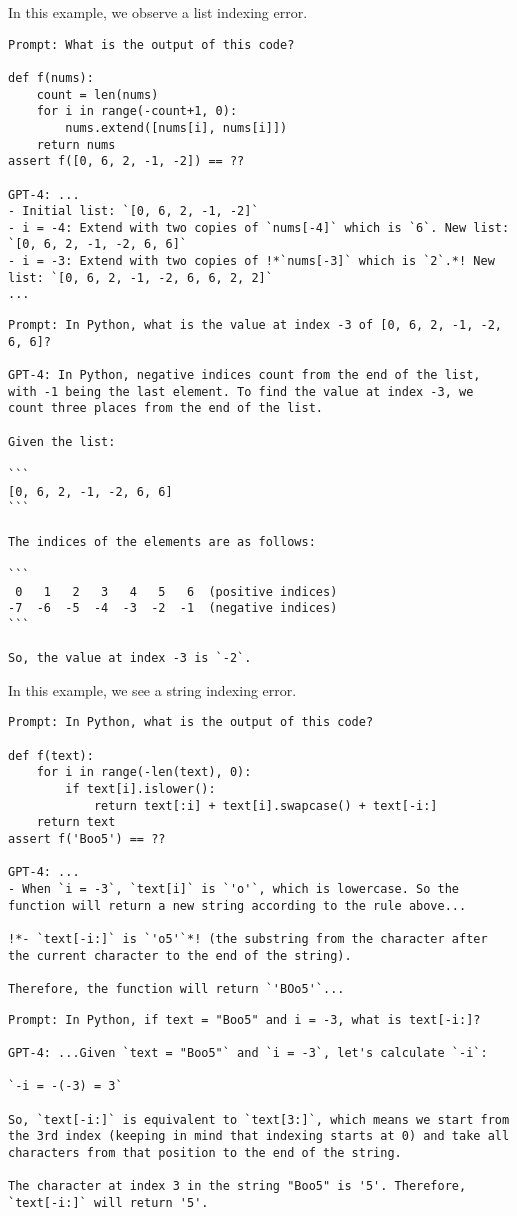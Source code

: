 In this example, we observe a list indexing error.
\begin{lstlisting}
Prompt: What is the output of this code?

def f(nums):
    count = len(nums)
    for i in range(-count+1, 0):
        nums.extend([nums[i], nums[i]])
    return nums
assert f([0, 6, 2, -1, -2]) == ??

GPT-4: ...
- Initial list: `[0, 6, 2, -1, -2]`
- i = -4: Extend with two copies of `nums[-4]` which is `6`. New list: `[0, 6, 2, -1, -2, 6, 6]`
- i = -3: Extend with two copies of !*`nums[-3]` which is `2`.*! New list: `[0, 6, 2, -1, -2, 6, 6, 2, 2]`
...
\end{lstlisting}

\begin{lstlisting}
Prompt: In Python, what is the value at index -3 of [0, 6, 2, -1, -2, 6, 6]?

GPT-4: In Python, negative indices count from the end of the list, with -1 being the last element. To find the value at index -3, we count three places from the end of the list.

Given the list:

```
[0, 6, 2, -1, -2, 6, 6]
```

The indices of the elements are as follows:

```
 0   1   2   3   4   5   6  (positive indices)
-7  -6  -5  -4  -3  -2  -1  (negative indices)
```

So, the value at index -3 is `-2`.
\end{lstlisting}

In this example, we see a string indexing error.

\begin{lstlisting}
Prompt: In Python, what is the output of this code?

def f(text):
    for i in range(-len(text), 0):
        if text[i].islower():
            return text[:i] + text[i].swapcase() + text[-i:]
    return text
assert f('Boo5') == ??

GPT-4: ...
- When `i = -3`, `text[i]` is `'o'`, which is lowercase. So the function will return a new string according to the rule above...

!*- `text[-i:]` is `'o5'`*! (the substring from the character after the current character to the end of the string).

Therefore, the function will return `'BOo5'`...
\end{lstlisting}

\begin{lstlisting}
Prompt: In Python, if text = "Boo5" and i = -3, what is text[-i:]?

GPT-4: ...Given `text = "Boo5"` and `i = -3`, let's calculate `-i`:

`-i = -(-3) = 3`

So, `text[-i:]` is equivalent to `text[3:]`, which means we start from the 3rd index (keeping in mind that indexing starts at 0) and take all characters from that position to the end of the string.

The character at index 3 in the string "Boo5" is '5'. Therefore, `text[-i:]` will return '5'.
\end{lstlisting}

